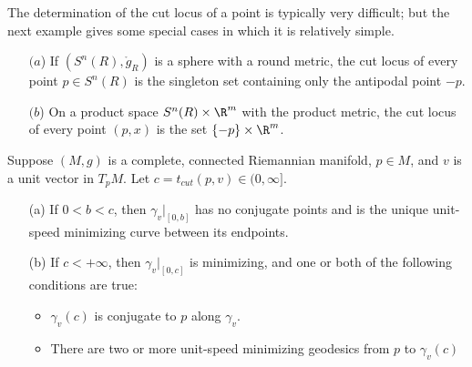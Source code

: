 The determination of the cut locus of a point is typically very difficult; but the next example gives some special cases in which it is relatively simple.
\begin{example}
\begin{itemize}
\item[$(a$)] If $(S^n(R),\mathring{g}_R)$ is a sphere with a round metric, the cut locus of every point $p\in S^n(R)$ is the singleton set containing only the antipodal 
point $-p$.
\item[$(b$)] On a product space $S^n(R)\times\R^m$ with the product metric, the cut locus of every point $(p,x)$ is the set $\{-p\}\times\R^m$. 
\end{itemize}
\end{example}
\begin{proposition}\label{Riemann cut time prop}
Suppose $(M,g)$ is a complete, connected Riemannian manifold, $p\in M$, and $v$ is a unit vector in $T_pM$. Let $c=t_{cut}(p,v)\in(0,\infty]$.
\begin{itemize}
\item[(a)] If $0<b<c$, then $\gamma_v|_{[0,b]}$ has no conjugate points and is the unique unit-speed minimizing curve between its endpoints.
\item[(b)] If $c<+\infty$, then $\gamma_v|_{[0,c]}$ is minimizing, and one or both of the following conditions are true:
\begin{itemize}
\item $\gamma_v(c)$ is conjugate to $p$ along $\gamma_v$.
\item There are two or more unit-speed minimizing geodesics from $p$ to $\gamma_v(c)$
\end{itemize} 
\end{itemize}
\end{proposition}
